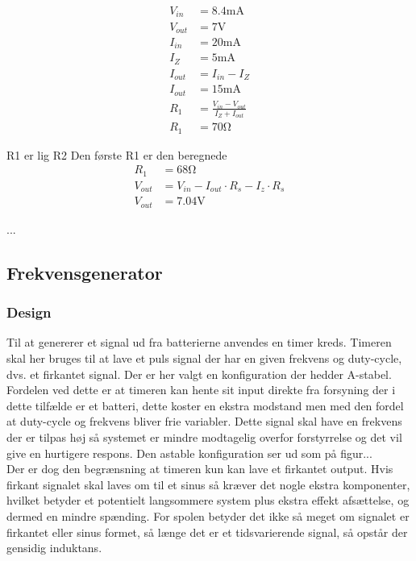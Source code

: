 	\begin{align}
	V_{in} & = 8.4 \si{\milli\ampere} \nonumber \\
	V_{out} & = 7 \si{\volt} \nonumber \\
	I_{in} & = 20\si{\milli\ampere} \nonumber \\
	I_Z & = 5 \si{\milli\ampere} \nonumber \\
	I_{out} & = I_{in} - I_Z \\
	I_{out} & = 15 \si{\milli\ampere} \nonumber \\
	R_1 & = \frac{V_{in} - V_{out}}{I_Z + I_{out}} \label{eq:RegulatorModstand} \\
	R_1 & = 70 \si{\ohm} \nonumber \label{eq:RegulatorModstandBeregnet}
	\end{align}
	
	R1 er lig R2
	Den første R1 er den beregnede
	\begin{align}
	R_1 & = 68 \si{\ohm} \nonumber \\
	V_{out} & = V_{in} - I_{out} \cdot R_s - I_z \cdot R_s \\
	V_{out} & = 7.04 \si{\volt} \label{eq:RegulatorBeregnetPotentiale} 
	\end{align}
	



...

\subsection{Frekvensgenerator}

\subsubsection{Design}
Til at genererer et signal ud fra batterierne anvendes en timer kreds. 
Timeren skal her bruges til at lave et puls signal der har en given frekvens og duty-cycle, dvs. et firkantet signal. 
Der er her valgt en konfiguration der hedder A-stabel. 
Fordelen ved dette er at timeren kan hente sit input direkte fra forsyning der i dette tilfælde er et batteri, dette koster en ekstra modstand men med den fordel at duty-cycle og frekvens bliver frie variabler. 
Dette signal skal have en frekvens der er tilpas høj så systemet er mindre modtagelig overfor forstyrrelse og det vil give en hurtigere respons. 
Den astable konfiguration ser ud som på figur...\\

Der er dog den begrænsning at timeren kun kan lave et firkantet output. 
Hvis firkant signalet skal laves om til et sinus så kræver det nogle ekstra komponenter, hvilket betyder et potentielt langsommere system plus ekstra effekt afsættelse, og dermed en mindre spænding. For spolen betyder det ikke så meget om signalet er firkantet eller sinus formet, så længe det er et tidsvarierende signal, så opstår der gensidig induktans.\\

